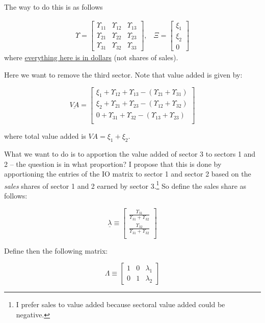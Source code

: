 \documentclass[12pt,english]{article}
\begin{document}
The way to do this is as follows

\begin{align*}
\Upsilon=\begin{bmatrix}
\Upsilon_{11}&\Upsilon_{12}&\Upsilon_{13}\\
\Upsilon_{21}&\Upsilon_{22}&\Upsilon_{23}\\
\Upsilon_{31}&\Upsilon_{32}&\Upsilon_{33}
\end{bmatrix},\;\;\;\Xi = \begin{bmatrix}
\xi_1\\ \xi_2\\0
\end{bmatrix}
\end{align*}
where \underline{everything here is in dollars} (not shares of sales).

Here we want to remove the third sector. Note that value added is given by:

$$
	\underline{VA} = \begin{bmatrix}
		\xi_1 +  \Upsilon_{12} + \Upsilon_{13} - (\Upsilon_{21} +\Upsilon_{31})\\
		\xi_2 +  \Upsilon_{21} + \Upsilon_{23} - (\Upsilon_{12} +\Upsilon_{32})\\
		0 +  \Upsilon_{31} + \Upsilon_{32} - (\Upsilon_{13} +\Upsilon_{23})\\
	\end{bmatrix}
$$

where total value added is $VA = \xi_1 + \xi_2$.

What we want to do is to apportion the value added of sector 3 to sectors 1 and 2 -- the question is in what proportion? I propose that this is done by apportioning the entries of the IO matrix to sector 1 and sector 2 based on the \emph{sales} shares of sector 1 and 2 earned by sector 3.\footnote{I prefer sales to value added because sectoral value added could be negative.} So define the sales share as follows:

$$
\underline{\lambda} \equiv	\begin{bmatrix}
 		\frac{\Upsilon_{31}}{\Upsilon_{31} + \Upsilon_{32} }\\
 		\frac{\Upsilon_{32}}{\Upsilon_{31} + \Upsilon_{32} }\\
	\end{bmatrix}
$$

Define then the following matrix:

$$
	\Lambda \equiv \begin{bmatrix}
		1 & 0 & \lambda_1\\
		0 & 1 & \lambda_2
	\end{bmatrix}
$$
\end{document}
